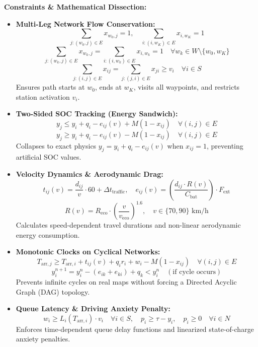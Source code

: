 \documentclass[a0,portrait]{a0poster}
\begin{document}
\begin{minipage}[t][83cm]{0.34\linewidth}
\vspace{0.2cm}
{\normalsize\textbf{Constraints \& Mathematical Dissection:}}
\vspace{0.1cm}
\begin{itemize}[leftmargin=1.2em, itemsep=6pt]
  \item \textbf{Multi-Leg Network Flow Conservation:}
    \[
      \sum_{j : (w_0, j) \in E} x_{w_0, j} = 1, \quad \sum_{i : (i, w_K) \in E} x_{i, w_K} = 1
    \]
    \[
      \sum_{j : (w_k, j) \in E} x_{w_k, j} = \sum_{i : (i, w_k) \in E} x_{i, w_k} = 1 \quad \forall w_k \in W \setminus \{w_0, w_K\}
    \]
    \[
      \sum_{j : (i, j) \in E} x_{ij} = \sum_{j : (j, i) \in E} x_{ji} \geq v_i \quad \forall i \in S
    \]
    Ensures path starts at $w_0$, ends at $w_K$, visits all waypoints, and restricts station activation $v_i$.

  \item \textbf{Two-Sided SOC Tracking (Energy Sandwich):}
    \[
      y_j \leq y_i + q_i - e_{ij}(v) + M(1 - x_{ij}) \quad \forall (i, j) \in E
    \]
    \[
      y_j \geq y_i + q_i - e_{ij}(v) - M(1 - x_{ij}) \quad \forall (i, j) \in E
    \]
    Collapses to exact physics $y_j = y_i + q_i - e_{ij}(v)$ when $x_{ij}=1$, preventing artificial SOC values.

  \item \textbf{Velocity Dynamics \& Aerodynamic Drag:}
    \[
      t_{ij}(v) = \frac{d_{ij}}{v} \cdot 60 + \Delta t_{\text{traffic}}, \quad
      e_{ij}(v) = \left( \frac{d_{ij} \cdot R(v)}{C_{\text{bat}}} \right) \cdot F_{\text{ext}}
    \]
    \[
      R(v) = R_{\text{eco}} \cdot \left( \frac{v}{v_{\text{eco}}} \right)^{1.6}, \quad v \in \{70, 90\} \text{ km/h}
    \]
    Calculates speed-dependent travel durations and non-linear aerodynamic energy consumption.

  \item \textbf{Monotonic Clocks on Cyclical Networks:}
    \[
      T_{\text{arr},j} \geq T_{\text{arr},i} + t_{ij}(v) + q_i r_i + w_i - M(1-x_{ij}) \quad \forall (i,j) \in E
    \]
    \[
      y_i^{n+1} = y_i^n - (e_{ik} + e_{ki}) + q_k < y_i^n \quad (\text{if cycle occurs})
    \]
    Prevents infinite cycles on real maps without forcing a Directed Acyclic Graph (DAG) topology.

  \item \textbf{Queue Latency \& Driving Anxiety Penalty:}
    \[
      w_i \geq L_i(T_{\text{arr},i}) \cdot v_i \quad \forall i \in S, \quad
      p_i \geq \tau - y_i, \quad p_i \geq 0 \quad \forall i \in N
    \]
    Enforces time-dependent queue delay functions and linearized state-of-charge anxiety penalties.
\end{itemize}


\end{minipage}
\end{document}
